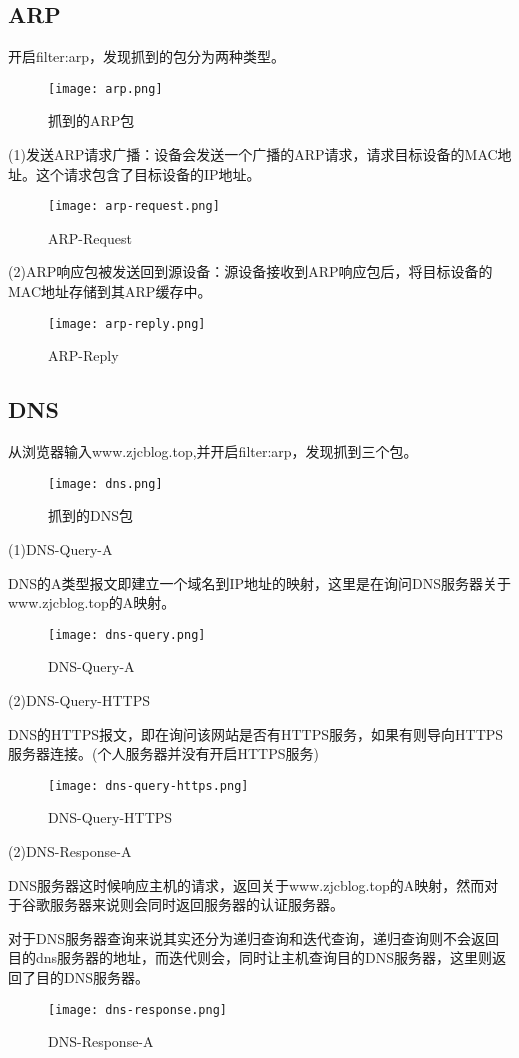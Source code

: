 \documentclass{xjtureport}
\begin{document}
\subsection{ARP}
开启filter:arp，发现抓到的包分为两种类型。
\begin{figure}[H]
	\centering
	\texttt{[image: arp.png]}
	\caption{抓到的ARP包}
\end{figure}
(1)发送ARP请求广播：设备会发送一个广播的ARP请求，请求目标设备的MAC地址。这个请求包含了目标设备的IP地址。
\begin{figure}[H]
	\centering
	\texttt{[image: arp-request.png]}
	\caption{ARP-Request}
\end{figure}
(2)ARP响应包被发送回到源设备：源设备接收到ARP响应包后，将目标设备的MAC地址存储到其ARP缓存中。
\begin{figure}[H]
	\centering
	\texttt{[image: arp-reply.png]}
	\caption{ARP-Reply}
\end{figure}

\subsection{DNS}
从浏览器输入www.zjcblog.top,并开启filter:arp，发现抓到三个包。
\begin{figure}[H]
	\centering
	\texttt{[image: dns.png]}
	\caption{抓到的DNS包}
\end{figure}
(1)DNS-Query-A\par
DNS的A类型报文即建立一个域名到IP地址的映射，这里是在询问DNS服务器关于www.zjcblog.top的A映射。
\begin{figure}[H]
	\centering
	\texttt{[image: dns-query.png]}
	\caption{DNS-Query-A}
\end{figure}
(2)DNS-Query-HTTPS\par
DNS的HTTPS报文，即在询问该网站是否有HTTPS服务，如果有则导向HTTPS服务器连接。(个人服务器并没有开启HTTPS服务)
\begin{figure}[H]
	\centering
	\texttt{[image: dns-query-https.png]}
	\caption{DNS-Query-HTTPS}
\end{figure}
(2)DNS-Response-A\par
DNS服务器这时候响应主机的请求，返回关于www.zjcblog.top的A映射，然而对于谷歌服务器来说则会同时返回服务器的认证服务器。\par
对于DNS服务器查询来说其实还分为递归查询和迭代查询，递归查询则不会返回目的dns服务器的地址，而迭代则会，同时让主机查询目的DNS服务器，这里则返回了目的DNS服务器。
\begin{figure}[H]
	\centering
	\texttt{[image: dns-response.png]}
	\caption{DNS-Response-A}
\end{figure}
\end{document}
